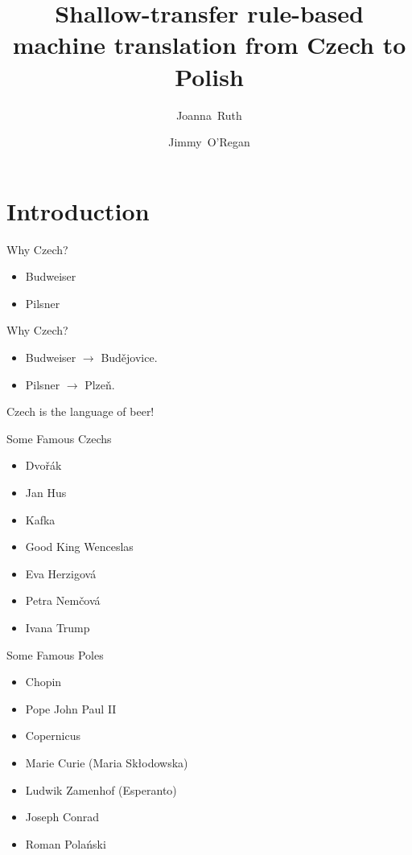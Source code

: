 \documentclass{beamer}
\title[Czech to Polish]{Shallow-transfer rule-based machine translation from Czech to Polish}
\author[Ruth, O'Regan] %
{Joanna~Ruth\inst{1} \and Jimmy~O'Regan\inst{2}}
\institute
{
  \inst{1}%
  Gda\'{n}sk University of Technology \\
  {\tt joannaruth1@gmail.com}
  \and
  \inst{2}%
  Eolaistriu Technologies \\
  {\tt joregan@gmail.com}
}
\date{}
\begin{document}
\begin{frame}
\titlepage
\end{frame}

%
%
%

\section{Introduction}
\begin{frame}{Why Czech?}
\begin{itemize}
\item Budweiser
\item Pilsner
\end{itemize}
\end{frame}

\begin{frame}{Why Czech?}
\begin{itemize}
\item Budweiser $\rightarrow$ Bud\v{e}jovice.
\item Pilsner $\rightarrow$ Plze\v{n}.
\end{itemize}

Czech is the language of beer!

\end{frame}

\begin{frame}{Some Famous Czechs}
\begin{itemize}
\item Dvo\v{r}ák
\item Jan Hus
\item Kafka
\item Good King Wenceslas
\item Eva Herzigová
\item Petra Nem\v{c}ová
\item Ivana Trump
\end{itemize}
\end{frame}

\begin{frame}{Some Famous Poles}
\begin{itemize}
\item Chopin
\item Pope John Paul II
\item Copernicus
\item Marie Curie (Maria Sk\l{}odowska)
\item Ludwik Zamenhof (Esperanto)
\item Joseph Conrad
\item Roman Pola\'{n}ski
\end{itemize}
\end{frame}
\end{document}
